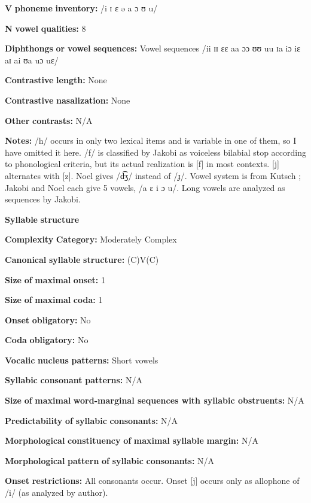 \begin{styleBody}
\textbf{V} \textbf{phoneme} \textbf{inventory:} /i ɪ ɛ ə a ɔ ʊ u/

\textbf{N} \textbf{vowel} \textbf{qualities:} 8

\textbf{Diphthongs} \textbf{or} \textbf{vowel} \textbf{sequences:} Vowel sequences /ii ɪɪ ɛɛ aa ɔɔ ʊʊ uu ɪa iɔ iɛ aɪ ai ʊa uɔ uɛ/

\textbf{Contrastive} \textbf{length:} None

\textbf{Contrastive} \textbf{nasalization:} None

\textbf{Other} \textbf{contrasts:} N/A

\textbf{Notes:} /h/ occurs in only two lexical items and is variable in one of them, so I have omitted it here. /f/ is classified by Jakobi as voiceless bilabial stop according to phonological criteria, but its actual realization is [f] in most contexts. [j] alternates with [z]. Noel gives /d͡ʒ/ instead of /ɟ/. Vowel system is from Kutsch \citet{LojengaWaag2004}; Jakobi and Noel each give 5 vowels, /a ɛ i ɔ u/. Long vowels are analyzed as sequences by Jakobi.

\textbf{Syllable} \textbf{structure}

\textbf{Complexity} \textbf{Category:} Moderately Complex

\textbf{Canonical} \textbf{syllable} \textbf{structure:} (C)V(C) \citep[53-8]{Jakobi1990}

\textbf{Size} \textbf{of} \textbf{maximal} \textbf{onset:} 1

\textbf{Size} \textbf{of} \textbf{maximal} \textbf{coda:} 1

\textbf{Onset} \textbf{obligatory:} No

\textbf{Coda} \textbf{obligatory:} No

\textbf{Vocalic} \textbf{nucleus} \textbf{patterns:} Short vowels

\textbf{Syllabic} \textbf{consonant} \textbf{patterns:} N/A

\textbf{Size} \textbf{of} \textbf{maximal} \textbf{word{}-marginal sequences with syllabic obstruents:} N/A

\textbf{Predictability} \textbf{of} \textbf{syllabic} \textbf{consonants:} N/A

\textbf{Morphological} \textbf{constituency} \textbf{of} \textbf{maximal} \textbf{syllable} \textbf{margin:} N/A

\textbf{Morphological} \textbf{pattern} \textbf{of} \textbf{syllabic} \textbf{consonants:} N/A

\textbf{Onset} \textbf{restrictions:} All consonants occur. Onset [j] occurs only as allophone of /i/ (as analyzed by author).


\end{styleBody}

